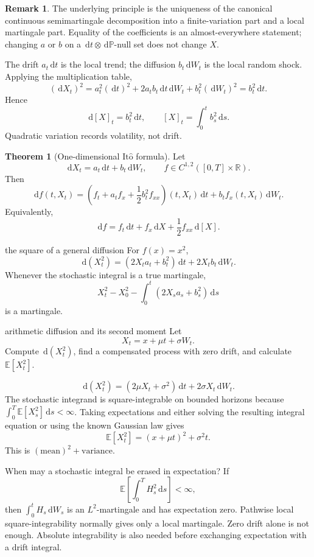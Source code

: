 \documentclass[10pt]{article}
\newcommand{\E}{\mathbb E}
\newcommand{\Pp}{\mathbb P}
\newcommand{\R}{\mathbb R}
\newcommand{\1}{\mathbf 1}
\newcommand{\dd}{\,\mathrm d}
\newcommand{\Ito}{\mathrm{It\hat{o}}}
\theoremstyle{definition}
\newtheorem{theorem}[definition]{Theorem}
\newtheorem{remark}[definition]{Remark}
\begin{document}
\begin{remark}
The underlying principle is the uniqueness of the canonical continuous
semimartingale decomposition into a finite-variation part and a local
martingale part. Equality of the coefficients is an almost-everywhere
statement; changing \(a\) or \(b\) on a
\(\dd t\otimes\dd\Pp\)-null set does not change \(X\).
\end{remark}

The drift \(a_t\dd t\) is the local trend; the diffusion
\(b_t\dd W_t\) is the local random shock. Applying the multiplication table,
\[
(\dd X_t)^2
=a_t^2(\dd t)^2+2a_tb_t\dd t\dd W_t+b_t^2(\dd W_t)^2
=b_t^2\dd t.
\]
Hence
\[
\boxed{
\dd[X]_t=b_t^2\dd t,\qquad
[X]_t=\int_0^tb_s^2\dd s.}
\]
Quadratic variation records volatility, not drift.

\begin{theorem}[One-dimensional \(\Ito\) formula]
Let
\[
\dd X_t=a_t\dd t+b_t\dd W_t,
\qquad f\in C^{1,2}([0,T]\times\R).
\]
Then
\[
\boxed{
\dd f(t,X_t)
=\left(f_t+a_tf_x+\frac12b_t^2f_{xx}\right)(t,X_t)\dd t
+b_tf_x(t,X_t)\dd W_t.}
\]
Equivalently,
\[
\dd f=f_t\dd t+f_x\dd X+\frac12f_{xx}\dd[X].
\]
\end{theorem}

\begin{boardexample}{the square of a general diffusion}
For \(f(x)=x^2\),
\[
\boxed{
\dd(X_t^2)
=(2X_ta_t+b_t^2)\dd t+2X_tb_t\dd W_t.}
\]
Whenever the stochastic integral is a true martingale,
\[
X_t^2-X_0^2-\int_0^t(2X_sa_s+b_s^2)\dd s
\]
is a martingale.
\end{boardexample}

\begin{studentexercise}{arithmetic diffusion and its second moment}
Let
\[
X_t=x+\mu t+\sigma W_t.
\]
Compute \(\dd(X_t^2)\), find a compensated process with zero drift, and
calculate \(\E[X_t^2]\).
\end{studentexercise}
\begin{shortsolution}
\[
\dd(X_t^2)
=(2\mu X_t+\sigma^2)\dd t+2\sigma X_t\dd W_t.
\]
The stochastic integrand is square-integrable on bounded horizons because
\(\int_0^T\E[X_s^2]\dd s<\infty\). Taking expectations and either solving
the resulting integral equation or using the known Gaussian law gives
\[
\boxed{\E[X_t^2]=(x+\mu t)^2+\sigma^2t.}
\]
This is \((\text{mean})^2+\text{variance}\).
\end{shortsolution}

\begin{warningbox}{When may a stochastic integral be erased in expectation?}
If
\[
\E\left[\int_0^TH_s^2\dd s\right]<\infty,
\]
then \(\int_0^tH_s\dd W_s\) is an \(L^2\)-martingale and has expectation
zero. Pathwise local square-integrability normally gives only a local
martingale. Zero drift alone is not enough. Absolute integrability is also
needed before exchanging expectation with a drift integral.
\end{warningbox}
\end{document}
